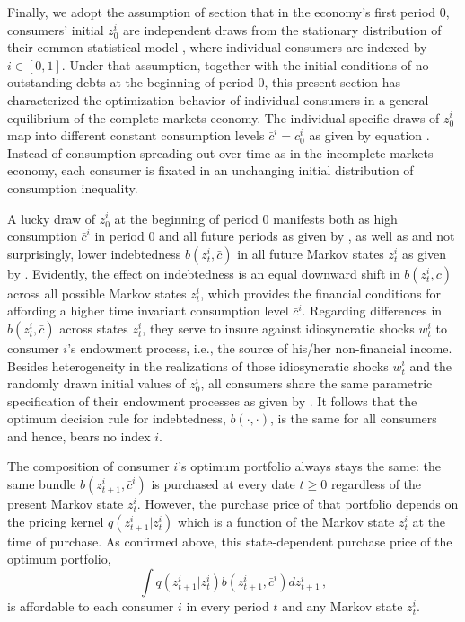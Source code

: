 Finally, we adopt the assumption of section
 that in the economy's first 
period $0$, consumers' initial $z^i_0$ are 
independent draws from the stationary distribution  
of their common statistical model ,
where individual consumers are indexed by 
$i\in[0,1]$. Under that assumption,
together with the initial conditions of no
outstanding debts at the beginning of period $0$,
this present section has characterized
the optimization behavior of individual
consumers in a general equilibrium of the
complete markets economy.
The individual-specific draws of $z^i_0$ map 
into different constant consumption levels 
$\bar c^i = c^i_0$ as given by equation 
. Instead of
consumption spreading out over time as in
the incomplete markets economy, each consumer
is fixated in an unchanging initial distribution
of consumption inequality. 

A lucky draw of $z^i_0$ at the beginning
of period $0$ manifests both as
high consumption $\bar c^i$ in period $0$
and all future periods as given by
, as well as and not surprisingly,
lower indebtedness $b(z^i_{t}, \bar c)$ in 
all future Markov states $z^i_{t}$ as given by
. Evidently, the effect on 
indebtedness is an equal downward
shift in $b(z^i_{t}, \bar c)$ across all 
possible Markov states $z^i_{t}$, which provides
the financial conditions for affording 
a higher time invariant 
consumption level $\bar c^i$. Regarding 
differences in $b(z^i_{t}, \bar c)$ across 
states $z^i_{t}$, they serve to insure 
against idiosyncratic shocks $w^i_{t}$ to  
consumer $i$'s endowment process, i.e., 
the source of his/her non-financial income.
Besides heterogeneity in the realizations
of those idiosyncratic shocks $w^i_{t}$ and 
the randomly drawn initial values of $z^i_0$, 
all consumers share the same parametric 
specification of their endowment processes as 
given by . It follows that the 
optimum decision rule for indebtedness, 
$b(\cdot, \cdot)$, is the same for all 
consumers and hence, bears no index $i$.

The composition of 
consumer $i$'s optimum  portfolio always stays
the same: the same bundle $b(z^i_{t+1}, \bar c^i)$
is purchased at every date $t\geq 0$ regardless
of the present Markov state $z^i_t$. However, the
purchase price of that portfolio depends on 
the pricing kernel $q(z^i_{t+1}|z^i_t)$ which
is a function of the Markov state $z^i_t$ at
the time of purchase. As confirmed above,
this state-dependent purchase price of the optimum 
portfolio, 
$$
\int q(z^i_{t+1}|z^i_t) b(z^i_{t+1}, \bar c^i) d z^i_{t+1} \,,
$$
is affordable to each consumer $i$ in every 
period $t$ and any Markov state $z^i_t$.


